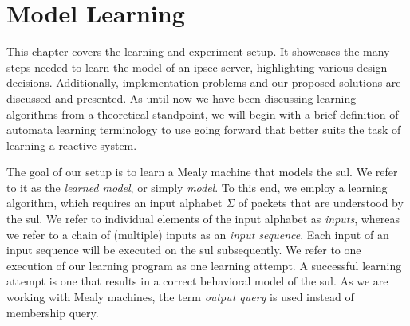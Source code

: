 %
%
% 
% 
% 

\chapter{Model Learning}

\label{chap:Learning}

This chapter covers the learning and experiment setup. It showcases the many steps needed to learn the model of an \ac{ipsec} server, highlighting various design decisions. Additionally, implementation problems and our proposed solutions are discussed and presented. As until now we have been discussing learning algorithms from a theoretical standpoint, we will begin with a brief definition of automata learning terminology to use going forward that better suits the task of learning a reactive system. 

The goal of our setup is to learn a Mealy machine that models the \ac{sul}. We refer to it as the \textit{learned model}, or simply \textit{model}. To this end, we employ a learning algorithm, which requires an input alphabet $\Sigma$ of packets that are understood by the \ac{sul}. We refer to individual elements of the input alphabet as \textit{inputs}, whereas we refer to a chain of (multiple) inputs as an \textit{input sequence}. Each input of an input sequence will be executed on the \ac{sul} subsequently. We refer to one execution of our learning program as one learning attempt. A successful learning attempt is one that results in a correct behavioral model of the \ac{sul}. As we are working with Mealy machines, the term \textit{output query} is used instead of membership query.

\iffalse
